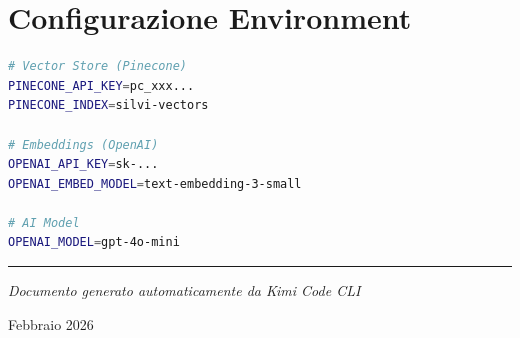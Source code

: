 \documentclass[11pt,a4paper]{article}
\begin{document}
\section{Configurazione Environment}

\begin{lstlisting}[language=bash, caption={Variabili d'ambiente richieste}]
# Vector Store (Pinecone)
PINECONE_API_KEY=pc_xxx...
PINECONE_INDEX=silvi-vectors

# Embeddings (OpenAI)
OPENAI_API_KEY=sk-...
OPENAI_EMBED_MODEL=text-embedding-3-small

# AI Model
OPENAI_MODEL=gpt-4o-mini
\end{lstlisting}

\vfill

\begin{center}
\textcolor{textgray}{\rule{0.5\textwidth}{0.5pt}}

\textit{Documento generato automaticamente da Kimi Code CLI}

\textcolor{textgray}{Febbraio 2026}
\end{center}
\end{document}
